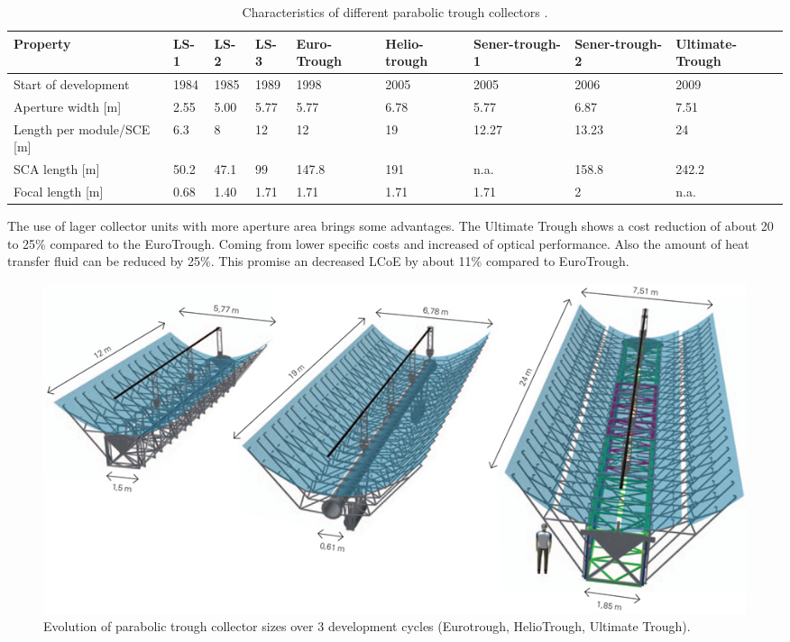 \begin{table}[h!]  
  \centering
	\begin{tabular}{  p{3.3cm}  C{1.0cm}  C{1.0cm}  C{1.5cm}  C{1.0cm}  C{1.0cm}  C{1.0cm}  C{1.0cm}  C{1.5cm}} 
\hline
\textbf{Property} & \textbf{LS-1} & \textbf{LS-2} & \textbf{LS-3} & \textbf{Euro-Trough} & \textbf{Helio-trough} & \textbf{Sener-trough-1} & \textbf{Sener-trough-2} & \textbf{Ultimate-Trough} \\ \hline \hline
Start of development & 1984 & 1985 & 1989 & 1998 & 2005 & 2005 & 2006 & 2009 \\ \hline
Aperture width [m] & 2.55 & 5.00 & 5.77 & 5.77 & 6.78 & 5.77 & 6.87 & 7.51 \\ \hline
Length per module/SCE [m] & 6.3 & 8 & 12 & 12 & 19 & 12.27 & 13.23 & 24 \\ \hline
SCA length [m] & 50.2 & 47.1 & 99 & 147.8 & 191 & n.a. & 158.8 & 242.2 \\ \hline
Focal length [m] & 0.68 & 1.40 & 1.71 & 1.71 & 1.71 & 1.71 & 2 & n.a. \\ \hline
\end{tabular}
\caption[Characteristics of different parabolic trough collectors.]{Characteristics of different parabolic trough collectors \cite{Pitz-Paal.2013}.}\label{tbl: TroughCharacteristics}
\end{table}


The use of lager collector units with more aperture area brings some advantages. The Ultimate Trough shows a cost reduction of about 20 to 25\% compared to the EuroTrough. Coming from lower specific costs and increased of optical performance. Also the amount of heat transfer fluid can be reduced by 25\%. This promise an decreased LCoE by about 11\% compared to EuroTrough. \cite{VonReeken2014}
\begin{figure}[!h] 
\centering
\includegraphics[width=1\linewidth]{FIG/Kollektoren}
\caption[Evolution of parabolic trough collector sizes over 3 development cycles (Eurotrough, HelioTrough, Ultimate Trough).]{Evolution of parabolic trough collector sizes over 3 development cycles (Eurotrough, HelioTrough, Ultimate Trough)\cite{Schlaichbergermannundpartner}.}\label{Kollektoren}
\end{figure}


